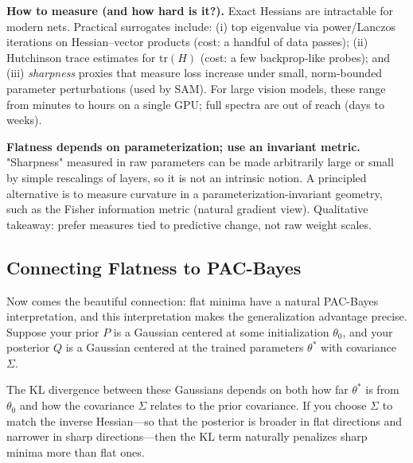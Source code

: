 \vspace{0.3cm}
\textbf{How to measure (and how hard is it?).}
Exact Hessians are intractable for modern nets. Practical surrogates include: (i) top eigenvalue via power/Lanczos iterations on Hessian--vector products (cost: a handful of data passes); (ii) Hutchinson trace estimates for $\mathrm{tr}(H)$ (cost: a few backprop-like probes); and (iii) \emph{sharpness} proxies that measure loss increase under small, norm-bounded parameter perturbations (used by SAM).
For large vision models, these range from minutes to hours on a single GPU; full spectra are out of reach (days to weeks).

\vspace{0.8em}

\begin{keyinsight}
\textbf{Flatness depends on parameterization; use an invariant metric.}
"Sharpness" measured in raw parameters can be made arbitrarily large or small by simple rescalings of layers, so it is not an intrinsic notion.
A principled alternative is to measure curvature in a parameterization-invariant geometry, such as the Fisher information metric (natural gradient view).
Qualitative takeaway: prefer measures tied to predictive change, not raw weight scales.
\end{keyinsight}

\vspace{1.2em}
\vspace{1.5em}

\subsection{Connecting Flatness to PAC-Bayes}

Now comes the beautiful connection: flat minima have a natural PAC-Bayes interpretation, and this interpretation makes the generalization advantage precise. Suppose your prior $P$ is a Gaussian centered at some initialization $\theta_0$, and your posterior $Q$ is a Gaussian centered at the trained parameters $\theta^*$ with covariance $\Sigma$.

\vspace{0.3cm}

The KL divergence between these Gaussians depends on both how far $\theta^*$ is from $\theta_0$ and how the covariance $\Sigma$ relates to the prior covariance. If you choose $\Sigma$ to match the inverse Hessian---so that the posterior is broader in flat directions and narrower in sharp directions---then the KL term naturally penalizes sharp minima more than flat ones.

